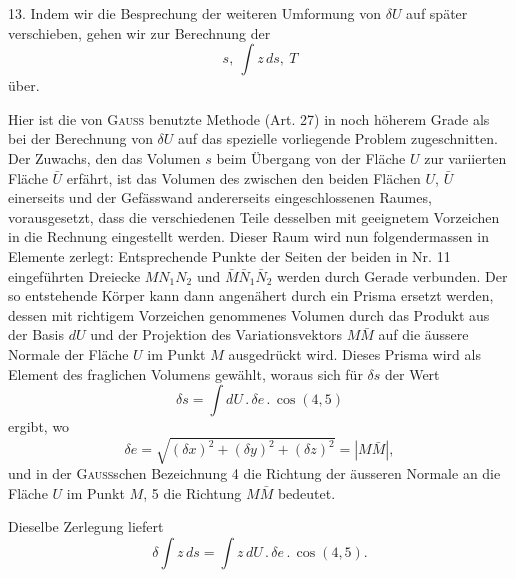 \clearpage\begingroup\NoSourceHead{}
\makeatletter\tagsleft@true\let\veqno\@@leqno\makeatother
\renewcommand{\thefootnote}{\arabic{footnote})}\setcounter{footnote}{39}
\noindent\hspace*{\parindent}13. Indem wir die Besprechung der weiteren Umformung von $\delta U$ auf
später verschieben, gehen wir zur Berechnung der 
\begin{equation*}
s,\ \int z\,ds,\ T\tag{32}
\end{equation*}
über.

Hier ist die von \textsc{Gauss} benutzte Methode (Art. 27) in noch höherem
Grade als bei der Berechnung von $\delta U$ auf das spezielle vorliegende Problem
zugeschnitten. Der Zuwachs, den das Volumen $s$ beim Übergang von der
Fläche $U$ zur variierten Fläche $\bar U$ erfährt, ist das Volumen des zwischen den
beiden Flächen $U$, $\bar U$ einerseits und der Gefässwand andererseits eingeschlossenen
Raumes, vorausgesetzt, dass die verschiedenen Teile desselben mit geeignetem
Vorzeichen in die Rechnung eingestellt werden. Dieser Raum wird nun
folgendermassen in Elemente zerlegt: Entsprechende Punkte der Seiten der
beiden in Nr. 11 eingeführten Dreiecke $MN_1N_2$ und $\bar M\bar N_1\bar N_2$ werden durch
Gerade verbunden. Der so entstehende Körper kann dann angenähert durch
ein Prisma ersetzt werden, dessen mit richtigem Vorzeichen genommenes Volumen
durch das Produkt aus der Basis $dU$ und der Projektion des Variationsvektors
$M\bar M$ auf die äussere Normale der Fläche $U$ im Punkt $M$ ausgedrückt
wird. Dieses Prisma wird als Element des fraglichen Volumens gewählt,
woraus sich für $\delta s$ der Wert
\begin{equation*}
\delta s=\int dU\mathbin{.}\delta e\mathbin{.}\cos(4,5)\tag{33}
\end{equation*}
ergibt, wo
\[
\delta e=\sqrt{(\delta x)^2+(\delta y)^2+(\delta z)^2}=|M\bar M|,
\]
und in der \textsc{Gauss}schen Bezeichnung 4 die Richtung der äusseren Normale an
die Fläche $U$ im Punkt $M$, 5 die Richtung $M\bar M$ bedeutet.

Dieselbe Zerlegung liefert
\begin{equation*}
\delta\int z\,ds=\int z\,dU\mathbin{.}\delta e\mathbin{.}\cos(4,5).\tag{34}
\end{equation*}

